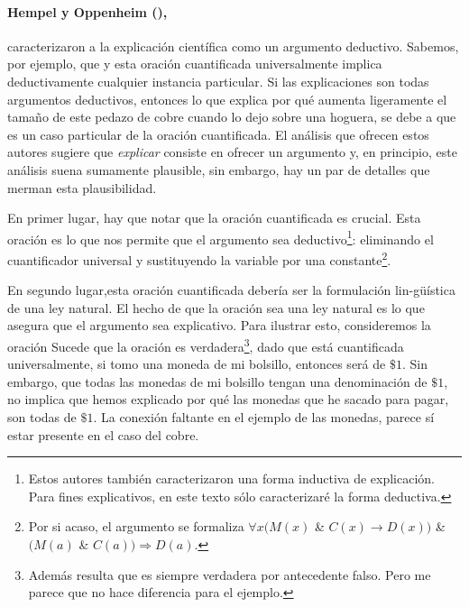 \paragraph{Hempel y Oppenheim (\citeyear{Hempel1948}),}
caracterizaron  a la explicación científica como un
argumento deductivo. Sabemos, por ejemplo, que  y esta oración
cuantificada universalmente implica deductivamente cualquier
instancia particular. Si las explicaciones son todas
argumentos deductivos, entonces lo que explica por qué
aumenta ligeramente el tamaño de este pedazo de cobre cuando
lo dejo sobre una hoguera, se debe a que es un caso
particular de la oración cuantificada. El análisis que 
ofrecen estos autores sugiere que \emph{explicar} consiste 
en ofrecer un argumento y, en principio, este análisis suena
sumamente plausible, sin embargo, hay un par de detalles que
merman esta plausibilidad.

En primer lugar, hay que notar que la oración cuantificada
es crucial. Esta oración es lo que nos permite que el 
argumento sea deductivo\footnote{
  Estos autores también caracterizaron una forma inductiva
  de explicación. Para fines explicativos, en este texto
  sólo caracterizaré la forma deductiva. 
}: 
eliminando el cuantificador universal y sustituyendo la 
variable por una constante\footnote{
	Por si acaso, el argumento se formaliza
  $\forall{x}(M(x)$ \& $C(x) \rightarrow
  D(x))$ \& $(M(a)$ \& $C(a))
  \Rightarrow	D(a)$. 
}. 

En segundo lugar,esta oración cuantificada debería ser la 
formulación lin-güística de una ley natural. El hecho de que
la oración sea una ley natural es lo que asegura que el
argumento sea explicativo. Para ilustrar esto, consideremos
la oración  Sucede que la oración es verdadera\footnote{
	Además resulta que es siempre verdadera por antecedente
	falso. Pero me parece que no hace diferencia para el
	ejemplo. 
},
dado que está cuantificada  universalmente, si tomo una
moneda de mi bolsillo, entonces será de $ \$1 $. Sin
embargo, que todas las monedas de mi bolsillo tengan una
denominación de $\$1$, no implica que hemos explicado por
qué las monedas que he sacado para pagar, son todas de
$ \$1 $. La conexión faltante en el ejemplo de las monedas,
parece sí estar presente en el caso del cobre.

